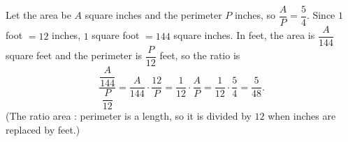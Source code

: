 Let the area be $A$ square inches and the perimeter $P$ inches, so $\dfrac{A}{P}=\dfrac54$. Since $1$ foot $=12$ inches, $1$ square foot $=144$ square inches. In feet, the area is $\dfrac{A}{144}$ square feet and the perimeter is $\dfrac{P}{12}$ feet, so the ratio is
\[\dfrac{\dfrac{A}{144}}{\dfrac{P}{12}}=\dfrac{A}{144}\cdot\dfrac{12}{P}=\dfrac{1}{12}\cdot\dfrac{A}{P}=\dfrac{1}{12}\cdot\dfrac54=\boxed{\dfrac{5}{48}}.\]
(The ratio area : perimeter is a length, so it is divided by $12$ when inches are replaced by feet.)
